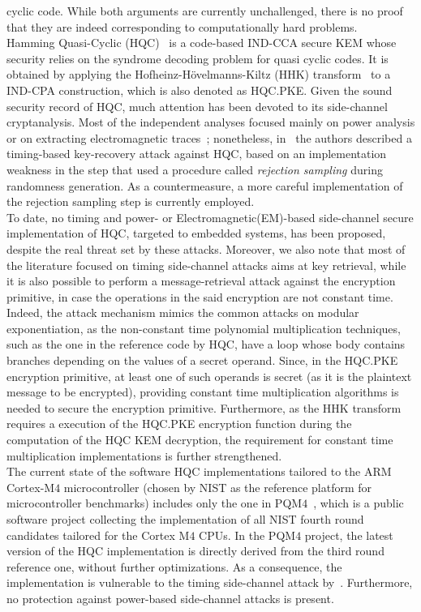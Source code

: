cyclic code.
While both arguments are currently unchallenged, there is no proof that they
are indeed corresponding to computationally hard problems.\\
\indent Hamming Quasi-Cyclic (HQC)~\cite{HQC,DBLP:journals/tit/Aguilar-Melchor18} is
a code-based IND-CCA secure KEM whose security relies on the syndrome 
decoding problem for quasi cyclic codes. It is obtained by applying the 
Hofheinz-H\"{o}velmanns-Kiltz (HHK) transform~\cite{DBLP:conf/tcc/HofheinzHK17} 
to a IND-CPA construction, which is also denoted as HQC.PKE.
Given the sound security record of HQC, much attention has been devoted to its 
side-channel cryptanalysis.
Most of the independent analyses focused mainly on power analysis or on 
extracting electromagnetic traces~\cite{wcc22,DBLP:conf/pqcrypto/GoyLG22,DBLP:conf/pqcrypto/SchambergerHRWS22,DBLP:conf/cardis/SchambergerRSW20};
nonetheless, in~\cite{DBLP:journals/tches/GuoHJLNS22} the authors described a 
timing-based key-recovery  attack against HQC, based on an implementation 
weakness in the step that used a procedure called \emph{rejection sampling} 
during randomness generation. 
As a countermeasure, a more careful implementation of the rejection sampling 
step is currently employed.\\
\indent 
To date, no timing and power- or Electromagnetic(EM)-based side-channel secure 
implementation of HQC, targeted to embedded systems, has been proposed, despite 
the real threat set by these attacks.
Moreover, we also note that most of the literature focused on timing side-channel
attacks aims at key retrieval, while it is also possible to perform a 
message-retrieval attack against the encryption primitive, in case the 
operations in the said encryption are not constant time.
Indeed, the attack mechanism mimics the common attacks on modular exponentiation, 
as the non-constant time polynomial multiplication techniques, such as the one
in the reference code by HQC, have a loop whose body contains branches depending
on the values of a secret operand.
Since, in the HQC.PKE encryption primitive, at least one of such operands is 
secret (as it is the plaintext message to be encrypted), providing constant time
multiplication algorithms is needed to secure the encryption primitive. 
Furthermore, as the HHK transform requires a execution of the HQC.PKE encryption 
function during the computation of the HQC KEM decryption, the requirement for 
constant time multiplication implementations is further strengthened.\\
\indent 
The current state of the software HQC implementations tailored to the ARM
Cortex-M$4$ microcontroller (chosen by NIST as the reference platform for
microcontroller benchmarks) includes only the one in PQM$4$~\cite{PQM4}, which is 
a public software project collecting the implementation of all NIST
fourth round candidates tailored for the Cortex M$4$ CPUs.
In the PQM$4$ project, the latest version of the HQC implementation is directly
derived from the third round reference one, without further optimizations.
As a consequence, the implementation is vulnerable to the timing side-channel 
attack by~\cite{DBLP:journals/tches/GuoHJLNS22}. Furthermore, no protection 
against power-based side-channel attacks is present.

